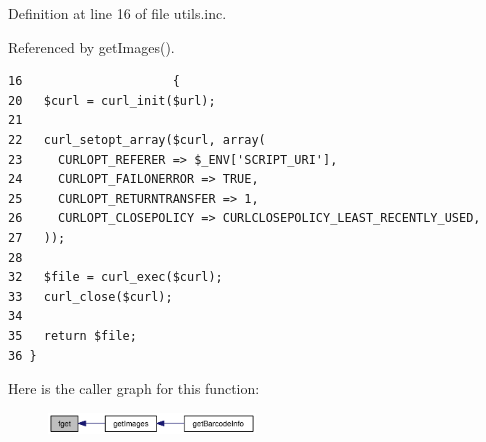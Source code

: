 Definition at line 16 of file utils.inc.

Referenced by getImages().

\begin{Code}\begin{verbatim}16                     {
20   $curl = curl_init($url);
21 
22   curl_setopt_array($curl, array(
23     CURLOPT_REFERER => $_ENV['SCRIPT_URI'],
24     CURLOPT_FAILONERROR => TRUE,
25     CURLOPT_RETURNTRANSFER => 1,
26     CURLOPT_CLOSEPOLICY => CURLCLOSEPOLICY_LEAST_RECENTLY_USED,
27   ));
28 
32   $file = curl_exec($curl);
33   curl_close($curl);
34 
35   return $file;
36 }\end{verbatim}
\end{Code}




Here is the caller graph for this function:\nopagebreak
\begin{figure}[H]
\begin{center}
\leavevmode
\includegraphics[width=156pt]{utils_8inc_846199262ea0cd07e0531f38d26dd9b3_icgraph}
\end{center}
\end{figure}
